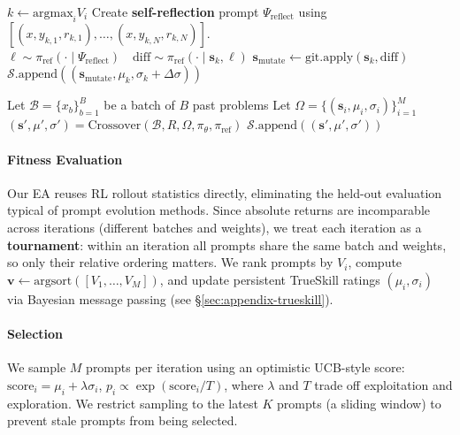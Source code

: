\documentclass{article}
\theoremstyle{plain}
\theoremstyle{definition}
\theoremstyle{remark}
\begin{document}
\begin{algorithm}[t]
\begin{algorithmic}
      \STATE $k\leftarrow \mathrm{argmax}_{i} V_{i}$ \hfill {}
      \STATE Create {\color{magenta}\textbf{{} self-reflection}} prompt $\Psi_{\text{reflect}}$ using $[(x, y_{k,1}, r_{k,1}), \dots, (x, y_{k,N}, r_{k,N})]$.
      \STATE $\ell \sim \pi_{\text{ref}}(\cdot \mid \Psi_{\text{reflect}}) \quad \mathrm{diff} \sim \pi_{\text{ref}}(\cdot \mid \mathbf{s}_{k}, \ell)$
      \STATE $\mathbf{s}_{\text{mutate}} \leftarrow \mathrm{git}.\mathrm{apply}(\mathbf{s}_{k}, \mathrm{diff})$ \hfill {}
      \STATE $\mathcal{S}.\mathrm{append}((\mathbf{s}_{\text{mutate}}, \mu_{k}, \sigma_{k} + \Delta\sigma))$
      \vspace{5pt}

          \STATE Let $\mathcal{B} = \{ x_{b} \}_{b=1}^{B}$ be a batch of $B$ past problems
          \STATE Let $\Omega=\{(\mathbf{s}_{i}, \mu_i, \sigma_i)\}_{i=1}^{M}$
          \STATE $(\mathbf{s}', \mu', \sigma')=\mathrm{Crossover}(\mathcal{B}, R, \Omega, \pi_{\theta}, \pi_{\text{ref}} )$ \hfill  {}
          \STATE $\mathcal{S}.\mathrm{append}((\mathbf{s}', \mu', \sigma'))$
      \ENDIF
      \ENDWHILE
    \end{algorithmic}
  \end{algorithm}

\vspace{-5pt}
\paragraph{Fitness Evaluation}
Our EA reuses RL rollout statistics directly, eliminating the held-out evaluation typical of prompt evolution methods. Since absolute returns are incomparable across iterations (different batches and weights), we treat each iteration as a \textbf{tournament}: within an iteration all prompts share the same batch and weights, so only their relative ordering matters. We rank prompts by $V_i$, compute $\mathbf{v} \leftarrow \mathrm{argsort}([V_{1},\dots, V_{M}])$, and update persistent TrueSkill \citep{trueskill} ratings $(\mu_i, \sigma_i)$ via Bayesian message passing (see \S\ref{sec:appendix-trueskill}).

\vspace{-5pt}
\paragraph{Selection} We sample $M$ prompts per iteration using an optimistic UCB-style score: $\mathrm{score}_{i} = \mu_{i}+\lambda \sigma_{i}$, $p_{i} \propto \exp ( \mathrm{score}_{i} /T )$\label{eq:selection-equation}, where $\lambda$ and $T$ trade off exploitation and exploration. We restrict sampling to the latest $K$ prompts (a sliding window) to prevent stale prompts from being selected.
\end{document}
